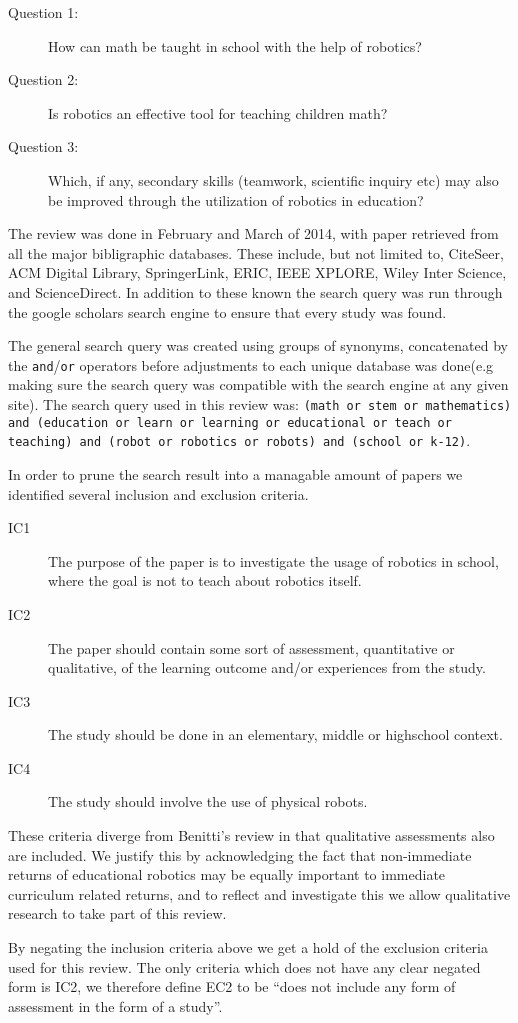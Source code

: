 \begin{description}
	\item[Question 1: ] How can math be taught in school with the help of robotics?
	\item[Question 2: ] Is robotics an effective tool for teaching children math?
	\item[Question 3: ] Which, if any, secondary skills (teamwork, scientific inquiry etc) may also be improved through the utilization of robotics in education?
\end{description}

\bigskip\noindent
The review was done in February and March of 2014, with paper retrieved from all the major bibligraphic databases. These include, but not limited to, CiteSeer, ACM Digital Library, SpringerLink, ERIC, IEEE XPLORE, Wiley Inter Science, and ScienceDirect. In addition to these known the search query was run through the 	google scholars search engine to ensure that every study was found.

\bigskip\noindent
The general search query was created using groups of synonyms, concatenated by the \texttt{and}/\texttt{or} operators before adjustments to each unique database was done(e.g making sure the search query was compatible with the search engine at any given site). The search query used in this review was: \texttt{(math or stem or mathematics) and (education or learn or learning or educational or teach or teaching) and (robot or robotics or robots) and (school or k-12)}. 

\bigskip\noindent
In order to prune the search result into a managable amount of papers we identified several inclusion and exclusion criteria. 
\begin{description}
	\item[IC1] The purpose of the paper is to investigate the usage of robotics in school, where the goal is not to teach about robotics itself.
	\item[IC2] The paper should contain some sort of assessment, quantitative or qualitative, of the learning outcome and/or experiences from the study. 
	\item[IC3] The study should be done in an elementary, middle or highschool context.
	\item[IC4] The study should involve the use of physical robots.
\end{description}
These criteria diverge from Benitti's review in that qualitative assessments also are included. 
We justify this by acknowledging the fact that non-immediate returns of educational robotics may be equally important to immediate curriculum related returns, 
and to reflect and investigate this we allow qualitative research to take part of this review. 	

\bigskip\noindent
By negating the inclusion criteria above we get a hold of the exclusion criteria used for this review. 
The only criteria which does not have any clear negated form is IC2, we therefore define EC2 to be "`does not include any form of assessment in the form of a study"'. 
